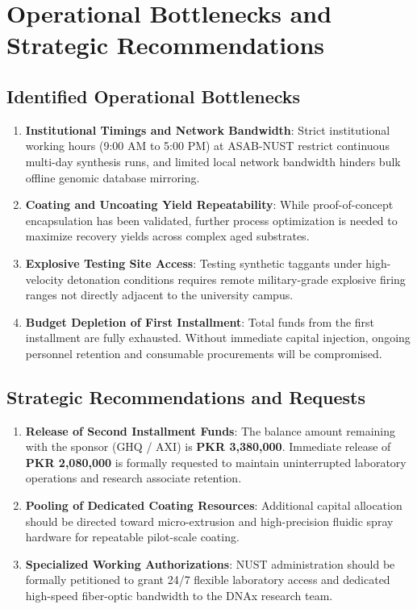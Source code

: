 \section{Operational Bottlenecks and Strategic Recommendations}

\subsection{Identified Operational Bottlenecks}
\begin{enumerate}
    \item \textbf{Institutional Timings and Network Bandwidth}: Strict institutional working hours (9:00 AM to 5:00 PM) at ASAB-NUST restrict continuous multi-day synthesis runs, and limited local network bandwidth hinders bulk offline genomic database mirroring.
    \item \textbf{Coating and Uncoating Yield Repeatability}: While proof-of-concept encapsulation has been validated, further process optimization is needed to maximize recovery yields across complex aged substrates.
    \item \textbf{Explosive Testing Site Access}: Testing synthetic taggants under high-velocity detonation conditions requires remote military-grade explosive firing ranges not directly adjacent to the university campus.
    \item \textbf{Budget Depletion of First Installment}: Total funds from the first installment are fully exhausted. Without immediate capital injection, ongoing personnel retention and consumable procurements will be compromised.
\end{enumerate}

\subsection{Strategic Recommendations and Requests}
\begin{enumerate}
    \item \textbf{Release of Second Installment Funds}: The balance amount remaining with the sponsor (GHQ / AXI) is \textbf{PKR 3,380,000}. Immediate release of \textbf{PKR 2,080,000} is formally requested to maintain uninterrupted laboratory operations and research associate retention.
    \item \textbf{Pooling of Dedicated Coating Resources}: Additional capital allocation should be directed toward micro-extrusion and high-precision fluidic spray hardware for repeatable pilot-scale coating.
    \item \textbf{Specialized Working Authorizations}: NUST administration should be formally petitioned to grant 24/7 flexible laboratory access and dedicated high-speed fiber-optic bandwidth to the DNAx research team.
\end{enumerate}
